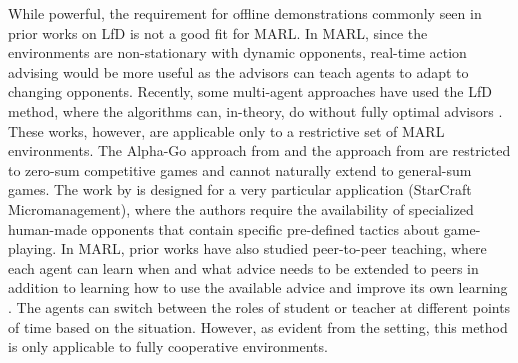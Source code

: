 \documentclass[jair, twoside,11pt,theapa]{article}
\begin{document}
While powerful, the requirement for offline demonstrations commonly seen in prior works on LfD is not a good fit for MARL. In MARL, since the environments are non-stationary with dynamic opponents, real-time action advising would be more useful as the advisors can teach agents to adapt to changing opponents. Recently, some multi-agent approaches have used the LfD method, where the algorithms can, in-theory, do without fully optimal advisors \citep{silver2016mastering, wang2018competitive, hu2018knowledge}. These works, however,  are applicable only to a restrictive set of MARL environments. The Alpha-Go approach from \citet{silver2016mastering} and the approach from \citet{wang2018competitive} are restricted to zero-sum competitive games and cannot naturally extend to general-sum games. The work by \citet{hu2018knowledge} is designed for a very particular application (StarCraft Micromanagement), where the authors require the availability of specialized human-made opponents that contain specific pre-defined tactics about game-playing. In MARL, prior works have also studied peer-to-peer teaching, where each agent can learn when and what advice needs to be extended to peers in addition to learning how to use the available advice and improve its own learning \citep{leno2017simultaneously, omidshafiei2019learning, dayong2020differential}. The agents can switch between the roles of student or teacher at different points of time based on the situation. However, as evident from the setting, this method is only applicable to fully cooperative environments. 
\end{document}
